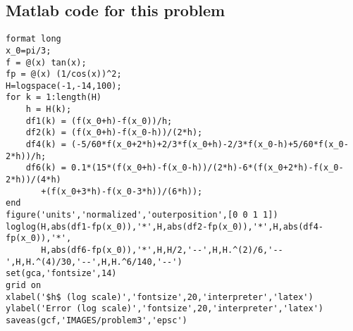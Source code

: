 \begin{solution}
\subsection*{Matlab code for this problem}
\begin{verbatim}
format long
x_0=pi/3;
f = @(x) tan(x);
fp = @(x) (1/cos(x))^2;
H=logspace(-1,-14,100);
for k = 1:length(H)
    h = H(k);
    df1(k) = (f(x_0+h)-f(x_0))/h;
    df2(k) = (f(x_0+h)-f(x_0-h))/(2*h);
    df4(k) = (-5/60*f(x_0+2*h)+2/3*f(x_0+h)-2/3*f(x_0-h)+5/60*f(x_0-2*h))/h;
    df6(k) = 0.1*(15*(f(x_0+h)-f(x_0-h))/(2*h)-6*(f(x_0+2*h)-f(x_0-2*h))/(4*h)
       +(f(x_0+3*h)-f(x_0-3*h))/(6*h));
end
figure('units','normalized','outerposition',[0 0 1 1])
loglog(H,abs(df1-fp(x_0)),'*',H,abs(df2-fp(x_0)),'*',H,abs(df4-fp(x_0)),'*',
	   H,abs(df6-fp(x_0)),'*',H,H/2,'--',H,H.^(2)/6,'--',H,H.^(4)/30,'--',H,H.^6/140,'--')
set(gca,'fontsize',14)
grid on
xlabel('$h$ (log scale)','fontsize',20,'interpreter','latex')
ylabel('Error (log scale)','fontsize',20,'interpreter','latex')
saveas(gcf,'IMAGES/problem3','epsc')
\end{verbatim}

\end{solution}